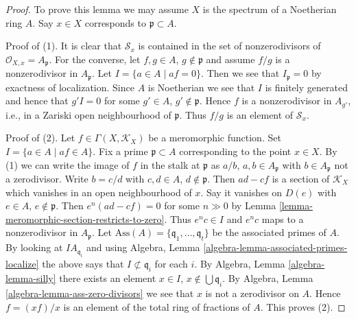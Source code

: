 \begin{proof}
To prove this lemma we may assume $X$ is the spectrum of a Noetherian
ring $A$. Say $x \in X$ corresponds to $\mathfrak p \subset A$.

\medskip\noindent
Proof of (1). It is clear that $\mathcal{S}_x$ is contained
in the set of nonzerodivisors of $\mathcal{O}_{X, x} = A_\mathfrak p$.
For the converse, let $f, g \in A$, $g \not \in \mathfrak p$ and
assume $f/g$ is a nonzerodivisor in $A_{\mathfrak p}$. Let
$I = \{a \in A \mid af = 0\}$. Then we see that $I_{\mathfrak p} = 0$ by
exactness of localization. Since $A$ is Noetherian we see that $I$
is finitely generated and hence that $g'I = 0$ for some $g' \in A$,
$g' \not \in \mathfrak p$. Hence $f$ is a nonzerodivisor
in $A_{g'}$, i.e., in a Zariski open neighbourhood of $\mathfrak p$.
Thus $f/g$ is an element of $\mathcal{S}_x$.

\medskip\noindent
Proof of (2). Let $f \in \Gamma(X, \mathcal{K}_X)$ be a meromorphic function.
Set $I = \{a \in A \mid af \in A\}$. Fix a prime $\mathfrak p \subset A$
corresponding to the point $x \in X$. By (1) we can write the image of $f$
in the stalk at $\mathfrak p$ as $a/b$, $a, b \in A_{\mathfrak p}$ with
$b \in A_{\mathfrak p}$ not a zerodivisor. Write $b = c/d$ with
$c, d \in A$, $d \not \in \mathfrak p$. Then $ad - cf$ is a section of
$\mathcal{K}_X$ which vanishes in an open neighbourhood of $x$. Say it
vanishes on $D(e)$ with $e \in A$, $e \not \in \mathfrak p$. Then
$e^n(ad - cf) = 0$ for some $n \gg 0$ by
Lemma \ref{lemma-meromorphic-section-restricts-to-zero}.
Thus $e^nc \in I$ and $e^nc$ maps to a nonzerodivisor in
$A_{\mathfrak p}$. Let
$\text{Ass}(A) = \{\mathfrak q_1, \ldots, \mathfrak q_t\}$ be the
associated primes of $A$. By looking at $IA_{\mathfrak q_i}$ and
using Algebra, Lemma \ref{algebra-lemma-associated-primes-localize}
the above says that
$I \not \subset \mathfrak q_i$ for each $i$. By
Algebra, Lemma \ref{algebra-lemma-silly}
there exists an element $x \in I$, $x \not \in \bigcup \mathfrak q_i$.
By Algebra, Lemma \ref{algebra-lemma-ass-zero-divisors}
we see that $x$ is not a zerodivisor on $A$.
Hence $f = (xf)/x$ is an element of the total ring of fractions of $A$.
This proves (2).
\end{proof}

